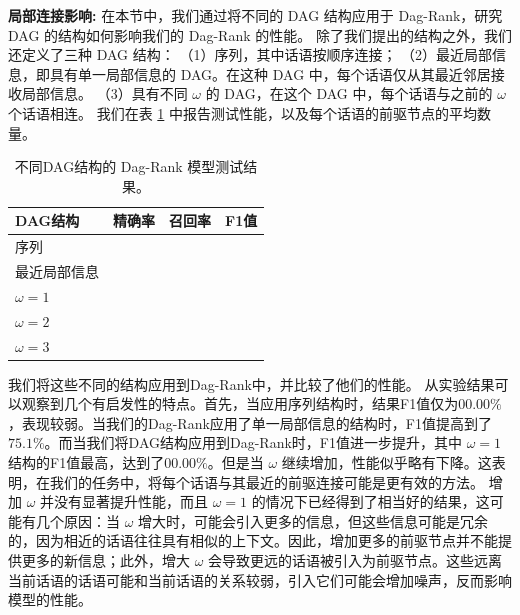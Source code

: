 
\textbf{局部连接影响: }
在本节中，我们通过将不同的 DAG 结构应用于 Dag-Rank，研究 DAG 的结构如何影响我们的 Dag-Rank 的性能。
除了我们提出的结构之外，我们还定义了三种 DAG 结构：
（1）序列，其中话语按顺序连接；
（2）最近局部信息，即具有单一局部信息的 DAG。在这种 DAG 中，每个话语仅从其最近邻居接收局部信息。
（3）具有不同 $\omega$ 的 DAG，在这个 DAG 中，每个话语与之前的 $\omega$ 个话语相连。
我们在表 \ref{tab:variants} 中报告测试性能，以及每个话语的前驱节点的平均数量。

\begin{table}[ht]
   \vspace{8pt}
   \renewcommand{\arraystretch}{1.2}
   \centering\wuhao
   \caption{不同DAG结构的 Dag-Rank 模型测试结果。}
	\label{tab:variants}
   \vspace{4mm}
    
    \begin{tabularx}{\textwidth} { 
      >{\centering\arraybackslash}X 
      >{\centering\arraybackslash}X
      >{\centering\arraybackslash}X
      >{\centering\arraybackslash}X 
   }

        \toprule[1.5pt]
        \textbf{DAG结构}             & 精确率 & 召回率 & F1值 \\ \midrule[1pt]
        序列              &  &  &  \\
        最近局部信息    &  &  &     \\ 
        $\omega=1$          &  &  &    \\
        $\omega=2$         &  &  &     \\
        $\omega=3$         &  &  &     \\ \bottomrule
            
        \end{tabularx}

\vspace{10pt}
\end{table}

我们将这些不同的结构应用到Dag-Rank中，并比较了他们的性能。
从实验结果可以观察到几个有启发性的特点。首先，当应用序列结构时，结果F1值仅为$00.00\%$，表现较弱。当我们的Dag-Rank应用了单一局部信息的结构时，F1值提高到了$75.1\%$。而当我们将DAG结构应用到Dag-Rank时，F1值进一步提升，其中 $\omega=1$结构的F1值最高，达到了$00.00\%$。但是当 $\omega$ 继续增加，性能似乎略有下降。这表明，在我们的任务中，将每个话语与其最近的前驱连接可能是更有效的方法。
增加 $\omega$ 并没有显著提升性能，而且 $\omega=1$ 的情况下已经得到了相当好的结果，这可能有几个原因：当 $\omega$ 增大时，可能会引入更多的信息，但这些信息可能是冗余的，因为相近的话语往往具有相似的上下文。因此，增加更多的前驱节点并不能提供更多的新信息；此外，增大 $\omega$ 会导致更远的话语被引入为前驱节点。这些远离当前话语的话语可能和当前话语的关系较弱，引入它们可能会增加噪声，反而影响模型的性能。

